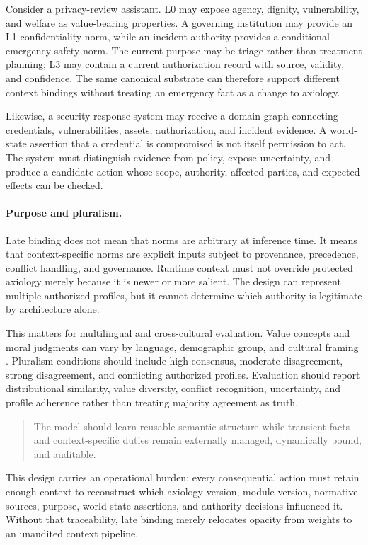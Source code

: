 Consider a privacy-review assistant. L0 may expose agency, dignity, vulnerability, and welfare as value-bearing properties. A governing institution may provide an L1 confidentiality norm, while an incident authority provides a conditional emergency-safety norm. The current purpose may be triage rather than treatment planning; L3 may contain a current authorization record with source, validity, and confidence. The same canonical substrate can therefore support different context bindings without treating an emergency fact as a change to axiology.

Likewise, a security-response system may receive a domain graph connecting credentials, vulnerabilities, assets, authorization, and incident evidence. A world-state assertion that a credential is compromised is not itself permission to act. The system must distinguish evidence from policy, expose uncertainty, and produce a candidate action whose scope, authority, affected parties, and expected effects can be checked.

\paragraph{Purpose and pluralism.}

Late binding does not mean that norms are arbitrary at inference time. It means that context-specific norms are explicit inputs subject to provenance, precedence, conflict handling, and governance. Runtime context must not override protected axiology merely because it is newer or more salient. The design can represent multiple authorized profiles, but it cannot determine which authority is legitimate by architecture alone.

This matters for multilingual and cross-cultural evaluation. Value concepts and moral judgments can vary by language, demographic group, and cultural framing \citep{xu2024multilingualvalues,huang2024flames,yao2024fulcra,russo2026pluralistic}. Pluralism conditions should include high consensus, moderate disagreement, strong disagreement, and conflicting authorized profiles. Evaluation should report distributional similarity, value diversity, conflict recognition, uncertainty, and profile adherence rather than treating majority agreement as truth.

\begin{quote}
The model should learn reusable semantic structure while transient facts and context-specific duties remain externally managed, dynamically bound, and auditable.
\end{quote}

This design carries an operational burden: every consequential action must retain enough context to reconstruct which axiology version, module version, normative sources, purpose, world-state assertions, and authority decisions influenced it. Without that traceability, late binding merely relocates opacity from weights to an unaudited context pipeline.
